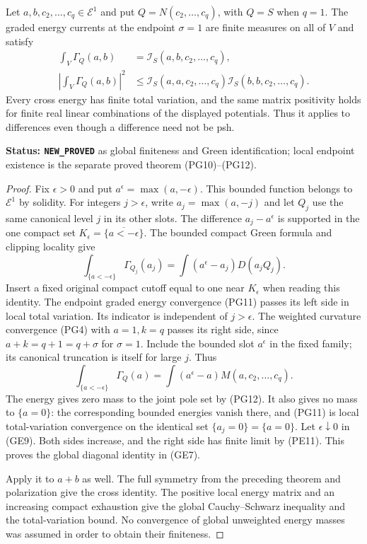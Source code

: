 \begin{theorem}
\label{thm:r11-global-first-energy-matrix}
Let $a,b,c_2,\ldots,c_q\in\mathcal E^1$ and put
$Q=N(c_2,\ldots,c_q)$, with $Q=S$ when $q=1$.
The graded energy currents at the endpoint $\sigma=1$ are
finite measures on all of $V$ and satisfy
\[
 \begin{split}
 \int_V\Gamma_Q(a,b)
       &=\mathcal I_S(a,b,c_2,\ldots,c_q),\\
 \left|\int_V\Gamma_Q(a,b)\right|^2
       &\leq\mathcal I_S(a,a,c_2,\ldots,c_q)
                   \mathcal I_S(b,b,c_2,\ldots,c_q).
 \end{split}
 \tag{GE7}
\]
Every cross energy has finite total variation, and the same
matrix positivity holds for finite real linear combinations
of the displayed potentials. Thus it applies to differences
even though a difference need not be psh.
\end{theorem}

\noindent\textbf{Status: \texttt{NEW\_PROVED}} as global
finiteness and Green identification; local endpoint existence
is the separate proved theorem (PG10)--(PG12).

\begin{proof}
Fix $\epsilon>0$ and put $a^\epsilon=\max(a,-\epsilon)$.
This bounded function belongs to $\mathcal E^1$ by solidity.
For integers $j>\epsilon$, write $a_j=\max(a,-j)$ and
let $Q_j$ use the same canonical level $j$ in its other slots.
The difference $a_j-a^\epsilon$ is supported in the one
compact set $K_\epsilon=\overline{\{a<-\epsilon\}}$.
The bounded compact Green formula and clipping locality give
\[
 \int_{\{a<-\epsilon\}}\Gamma_{Q_j}(a_j)
                =\int(a^\epsilon-a_j)D(a_jQ_j).
 \tag{GE8}
\]
Insert a fixed original compact cutoff equal to one near
$K_\epsilon$ when reading this identity. The endpoint graded
energy convergence (PG11) passes its left side in local total
variation. Its indicator is independent of $j>\epsilon$.
The weighted curvature convergence (PG4) with $a=1,k=q$
passes its right side, since $a+k=q+1=q+\sigma$ for
$\sigma=1$. Include the bounded slot $a^\epsilon$ in the
fixed family; its canonical truncation is itself for large $j$.
Thus
\[
 \int_{\{a<-\epsilon\}}\Gamma_Q(a)
           =\int(a^\epsilon-a)M(a,c_2,\ldots,c_q).
 \tag{GE9}
\]
The energy gives zero mass to the joint pole set by (PG12).
It also gives no mass to $\{a=0\}$: the corresponding bounded
energies vanish there, and (PG11) is local total-variation
convergence on the identical set $\{a_j=0\}=\{a=0\}$.
Let $\epsilon\downarrow0$ in (GE9). Both sides increase,
and the right side has finite limit by (PE11). This proves
the global diagonal identity in (GE7).

Apply it to $a+b$ as well. The full symmetry from the
preceding theorem and polarization give the cross identity.
The positive local energy matrix and an increasing compact
exhaustion give the global Cauchy--Schwarz inequality and the
total-variation bound. No convergence of global unweighted
energy masses was assumed in order to obtain their finiteness.
\end{proof}

